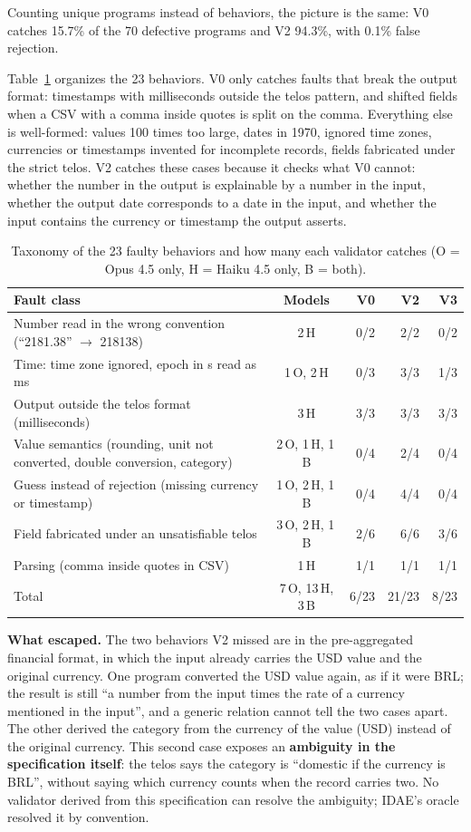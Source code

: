 \documentclass[sigconf,nonacm]{acmart}
\begin{document}
Counting unique programs instead of behaviors, the picture is the same: V0 catches 15.7\% of the 70 defective programs and V2 94.3\%, with 0.1\% false rejection.

Table~\ref{tab:taxonomia} organizes the 23 behaviors. V0 only catches faults that break the output format: timestamps with milliseconds outside the telos pattern, and shifted fields when a CSV with a comma inside quotes is split on the comma. Everything else is well-formed: values 100 times too large, dates in 1970, ignored time zones, currencies or timestamps invented for incomplete records, fields fabricated under the strict telos. V2 catches these cases because it checks what V0 cannot: whether the number in the output is explainable by a number in the input, whether the output date corresponds to a date in the input, and whether the input contains the currency or timestamp the output asserts.

\begin{table}[t]
\caption{Taxonomy of the 23 faulty behaviors and how many each validator catches (O = Opus 4.5 only, H = Haiku 4.5 only, B = both).}
\label{tab:taxonomia}
\small
\begin{tabular}{>{\raggedright\arraybackslash}p{3.5cm}crrr}
\toprule
Fault class & Models & V0 & V2 & V3 \\
\midrule
Number read in the wrong convention (``2181.38'' $\to$ 218138) & 2\,H & 0/2 & 2/2 & 0/2 \\
Time: time zone ignored, epoch in s read as ms & 1\,O, 2\,H & 0/3 & 3/3 & 1/3 \\
Output outside the telos format (milliseconds) & 3\,H & 3/3 & 3/3 & 3/3 \\
Value semantics (rounding, unit not converted, double conversion, category) & 2\,O, 1\,H, 1\,B & 0/4 & 2/4 & 0/4 \\
Guess instead of rejection (missing currency or timestamp) & 1\,O, 2\,H, 1\,B & 0/4 & 4/4 & 0/4 \\
Field fabricated under an unsatisfiable telos & 3\,O, 2\,H, 1\,B & 2/6 & 6/6 & 3/6 \\
Parsing (comma inside quotes in CSV) & 1\,H & 1/1 & 1/1 & 1/1 \\
\midrule
Total & 7\,O, 13\,H, 3\,B & 6/23 & 21/23 & 8/23 \\
\bottomrule
\end{tabular}
\end{table}

\textbf{What escaped.} The two behaviors V2 missed are in the pre-aggregated financial format, in which the input already carries the USD value and the original currency. One program converted the USD value again, as if it were BRL; the result is still ``a number from the input times the rate of a currency mentioned in the input'', and a generic relation cannot tell the two cases apart. The other derived the category from the currency of the value (USD) instead of the original currency. This second case exposes an \textbf{ambiguity in the specification itself}: the telos says the category is ``domestic if the currency is BRL'', without saying which currency counts when the record carries two. No validator derived from this specification can resolve the ambiguity; IDAE's oracle resolved it by convention.
\end{document}
